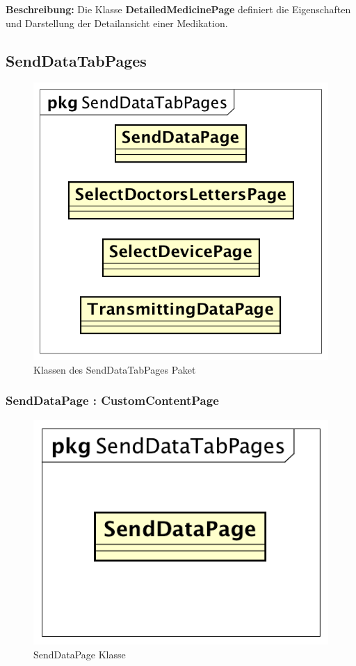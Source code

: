 \documentclass[a4paper]{scrreprt}
\begin{document}
\textbf{Beschreibung:} Die Klasse \textbf{DetailedMedicinePage} definiert die Eigenschaften und Darstellung der Detailansicht einer Medikation.

\subsection{SendDataTabPages}
\begin{figure}[H]
\centering
\includegraphics[width=0.55\textheight]{graphics/Klassendiagramme/View/SendDataTabPages.png}
\caption{Klassen des SendDataTabPages Paket}
\end{figure}

\subsubsection{SendDataPage : CustomContentPage}
\begin{figure}[H]
\centering
\includegraphics[width=0.45\textheight]{graphics/Klassendiagramme/View/SendDataPage.png}
\caption{SendDataPage Klasse}
\end{figure}
\end{document}
